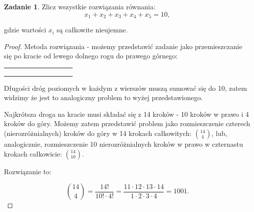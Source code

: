 \documentclass[11pt]{article}
\theoremstyle{definition}
\newtheorem{zadanie}{Zadanie}
\numberwithin{zadanie}{subsection}
\begin{document}
\begin{zadanie}
    Zlicz wszystkie rozwiązania równania:
    $$x_1+x_2+x_3+x_4+x_5 = 10,$$

    gdzie wartości $x_i$ są całkowite nieujemne.
\end{zadanie}
\begin{proof}
    Metoda rozwiązania - możemy przedstawić zadanie jako przemieszczanie się po kracie od lewego dolnego rogu do prawego górnego:

    \begin{center}
        \begin{tabular}{ |c|c|c|c|c|c|c|c|c|c| }
            \hline
             &  &  &  &  &  &  &  &  & \\
            \hline
             &  &  &  &  &  &  &  &  & \\
            \hline
             &  &  &  &  &  &  &  &  & \\
            \hline
             &  &  &  &  &  &  &  &  & \\
            \hline
        \end{tabular}
    \end{center}
    Długości dróg poziomych w każdym z wierszów muszą sumować się do 10, zatem widzimy że jest to analogiczny problem to wyżej przedstawionego.

    Najkrótsza droga na kracie musi składać się z 14 kroków - 10 kroków w prawo i 4 kroków do góry. Możemy zatem przedstawić problem jako rozmieszczenie czterech (nierozróżnialnych) kroków do góry w 14 krokach całkowitych: $\binom{14}{4}$, lub, analogicznie, rozmieszczenie 10 nierozróżnialnych kroków w prawo w czternastu krokach całkowicie: $\binom{14}{10}$.

    Rozwiązanie to:

    $$\binom{14}{4} = \frac{14!}{10!\cdot4!} = \frac{11\cdot12\cdot13\cdot14}{1\cdot2\cdot3\cdot4} = 1001.$$
\end{proof}
\end{document}
